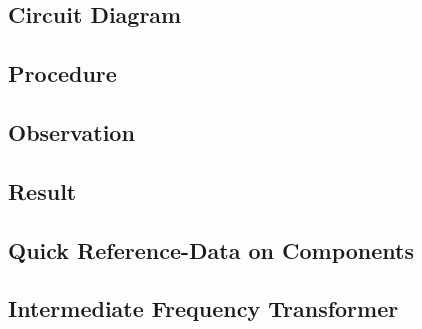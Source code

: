 \documentclass{book}
\begin{document}
\section*{Circuit Diagram}
\section*{Procedure}
\section*{Observation}
\section*{Result}

\begin{appendix}
\chapter {Quick Reference-Data on Components}

\section{Intermediate Frequency Transformer}
\label{IFT}



\end{appendix}
\begin{thebibliography}{1}
\bibitem{}

\end{thebibliography}
\end{document}

